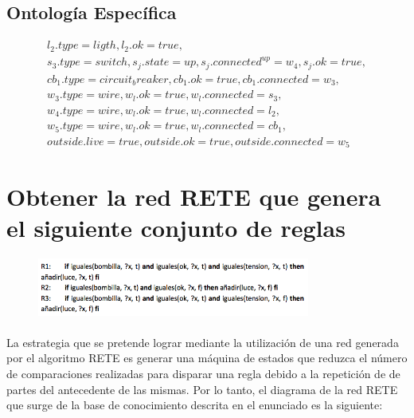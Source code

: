 \documentclass[10pt, a4paper,spanish]{article}
\begin{document}
		\subsection{Ontología Específica}

			\begin{multline*}
				l_2.type=ligth, l_2.ok=true, \\
				s_3.type=switch, s_j.state=up, s_j.connected^{up}=w_4, s_j.ok=true, \\
				cb_1.type=circuit_breaker, cb_1.ok=true, cb_1.connected=w_3, \\
				w_3.type=wire, w_l.ok=true, w_l.connected=s_3, \\
				w_4.type=wire, w_l.ok=true, w_l.connected=l_2, \\
				w_5.type=wire, w_l.ok=true, w_l.connected=cb_1, \\
				outside.live=true, outside.ok=true, outside.connected=w_5
			\end{multline*}

	\section{Obtener la red RETE que genera el siguiente conjunto de reglas}

		\begin{figure}[H]
			\begin{center}
				\includegraphics[width=0.8\textwidth]{rete-exercise}
			\end{center}
		\end{figure}

		\paragraph{}
		La estrategia que se pretende lograr mediante la utilización de una red generada por el algoritmo RETE es generar una máquina de estados que reduzca el número de comparaciones realizadas para disparar una regla debido a la repetición de de partes del antecedente de las mismas. Por lo tanto, el diagrama de la red RETE que surge de la base de conocimiento descrita en el enunciado es la siguiente:
\end{document}
